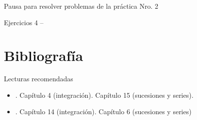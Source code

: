 \documentclass[9pt, aspectratio=169]{beamer}
\begin{document}
\begin{frame}[standout]
Pausa para resolver problemas de la práctica Nro. 2

Ejercicios 4 --
\end{frame}



\section*{Bibliografía}
\begin{frame}[allowframebreaks]{Lecturas recomendadas}
\begin{itemize}
 \item {}. Capítulo 4 (integración). Capítulo 15 (sucesiones y series).
 \item {}. Capítulo 14 (integración). Capítulo 6 (sucesiones y series)
\end{itemize}

\end{frame}
\end{document}
